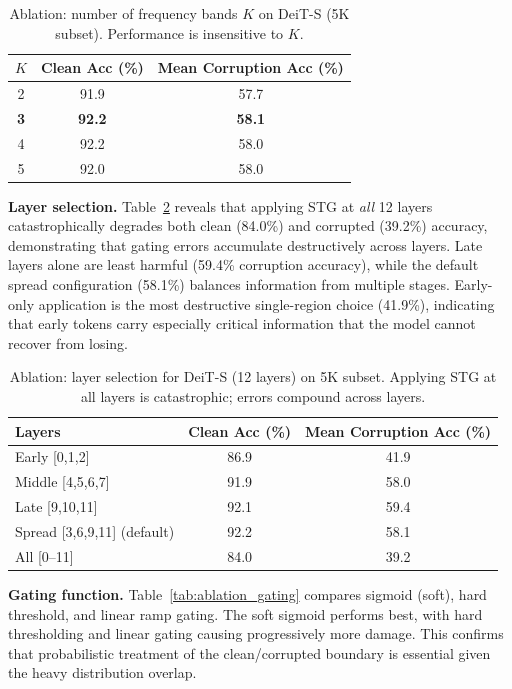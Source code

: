 \documentclass{article}
\newcommand{\methodname}{STG}
\begin{document}
\begin{table}[t]
\centering
\caption{Ablation: number of frequency bands $K$ on DeiT-S (5K subset). Performance is insensitive to $K$.}
\label{tab:ablation_K}
\begin{tabular}{ccc}
\toprule
$K$ & Clean Acc (\%) & Mean Corruption Acc (\%) \\
\midrule
2 & 91.9 & 57.7 \\
\textbf{3} & \textbf{92.2} & \textbf{58.1} \\
4 & 92.2 & 58.0 \\
5 & 92.0 & 58.0 \\
\bottomrule
\end{tabular}
\end{table}

\textbf{Layer selection.} Table~\ref{tab:ablation_layers} reveals that applying \methodname{} at \emph{all} 12 layers catastrophically degrades both clean (84.0\%) and corrupted (39.2\%) accuracy, demonstrating that gating errors accumulate destructively across layers. Late layers alone are least harmful (59.4\% corruption accuracy), while the default spread configuration (58.1\%) balances information from multiple stages. Early-only application is the most destructive single-region choice (41.9\%), indicating that early tokens carry especially critical information that the model cannot recover from losing.

\begin{table}[t]
\centering
\caption{Ablation: layer selection for DeiT-S (12 layers) on 5K subset. Applying STG at all layers is catastrophic; errors compound across layers.}
\label{tab:ablation_layers}
\begin{tabular}{lcc}
\toprule
Layers & Clean Acc (\%) & Mean Corruption Acc (\%) \\
\midrule
Early [0,1,2] & 86.9 & 41.9 \\
Middle [4,5,6,7] & 91.9 & 58.0 \\
Late [9,10,11] & 92.1 & 59.4 \\
Spread [3,6,9,11] (default) & 92.2 & 58.1 \\
All [0--11] & 84.0 & 39.2 \\
\bottomrule
\end{tabular}
\end{table}

\textbf{Gating function.} Table~\ref{tab:ablation_gating} compares sigmoid (soft), hard threshold, and linear ramp gating. The soft sigmoid performs best, with hard thresholding and linear gating causing progressively more damage. This confirms that probabilistic treatment of the clean/corrupted boundary is essential given the heavy distribution overlap.
\end{document}
